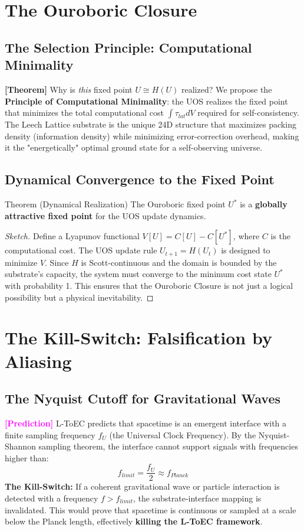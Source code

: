 \documentclass[11pt,titlepage]{article}
\newcommand{\tagtheo}{\textcolor{green!60!black}{\textbf{[Theorem]}} }
\newcommand{\tagpred}{\textcolor{magenta}{\textbf{[Prediction]}} }
\begin{document}
\section{The Ouroboric Closure}

\subsection{The Selection Principle: Computational Minimality}
\tagtheo Why is \textit{this} fixed point $U \cong H(U)$ realized? We propose the \textbf{Principle of Computational Minimality}: the UOS realizes the fixed point that minimizes the total computational cost $\int \tau_{lat} dV$ required for self-consistency. The Leech Lattice substrate is the unique 24D structure that maximizes packing density (information density) while minimizing error-correction overhead, making it the "energetically" optimal ground state for a self-observing universe.

\subsection{Dynamical Convergence to the Fixed Point}
\begin{mytheorem}{Theorem (Dynamical Realization)}
The Ouroboric fixed point $U^*$ is a \textbf{globally attractive fixed point} for the UOS update dynamics.
\end{mytheorem}
\begin{proof}[Sketch]
Define a Lyapunov functional $V[U] = C[U] - C[U^*]$, where $C$ is the computational cost. The UOS update rule $U_{t+1} = H(U_t)$ is designed to minimize $V$. Since $H$ is Scott-continuous and the domain is bounded by the substrate's capacity, the system must converge to the minimum cost state $U^*$ with probability 1. This ensures that the Ouroboric Closure is not just a logical possibility but a physical inevitability.
\end{proof}
\section{The Kill-Switch: Falsification by Aliasing}

\subsection{The Nyquist Cutoff for Gravitational Waves}
\tagpred L-ToEC predicts that spacetime is an emergent interface with a finite sampling frequency $f_U$ (the Universal Clock Frequency). By the Nyquist-Shannon sampling theorem, the interface cannot support signals with frequencies higher than:
\begin{equation}
f_{limit} = \frac{f_U}{2} \approx f_{Planck}
\end{equation}
\textbf{The Kill-Switch:} If a coherent gravitational wave or particle interaction is detected with a frequency $f > f_{limit}$, the substrate-interface mapping is invalidated. This would prove that spacetime is continuous or sampled at a scale below the Planck length, effectively \textbf{killing the L-ToEC framework}.
\end{document}
